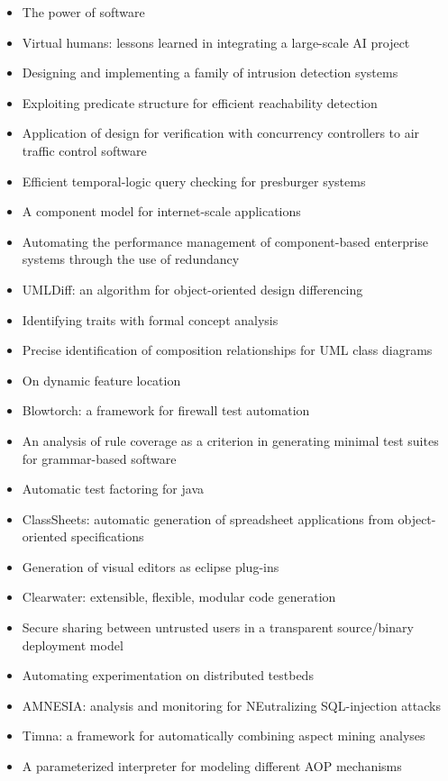 {\small
\begin{itemize}[itemsep=-1ex]
  \item The power of software
  \item Virtual humans: lessons learned in integrating a large-scale AI project
  \item Designing and implementing a family of intrusion detection systems
  \item Exploiting predicate structure for efficient reachability detection
  \item Application of design for verification with concurrency controllers to air traffic control software
  \item Efficient temporal-logic query checking for presburger systems
  \item A component model for internet-scale applications
  \item Automating the performance management of component-based enterprise systems through the use of redundancy
  \item UMLDiff: an algorithm for object-oriented design differencing
  \item Identifying traits with formal concept analysis
  \item Precise identification of composition relationships for UML class diagrams
  \item On dynamic feature location
  \item Blowtorch: a framework for firewall test automation
  \item An analysis of rule coverage as a criterion in generating minimal test suites for grammar-based software
  \item Automatic test factoring for java
  \item ClassSheets: automatic generation of spreadsheet applications from object-oriented specifications
  \item Generation of visual editors as eclipse plug-ins
  \item Clearwater: extensible, flexible, modular code generation
  \item Secure sharing between untrusted users in a transparent source/binary deployment model
  \item Automating experimentation on distributed testbeds
  \item AMNESIA: analysis and monitoring for NEutralizing SQL-injection attacks
  \item Timna: a framework for automatically combining aspect mining analyses
  \item A parameterized interpreter for modeling different AOP mechanisms

\end{itemize}}

